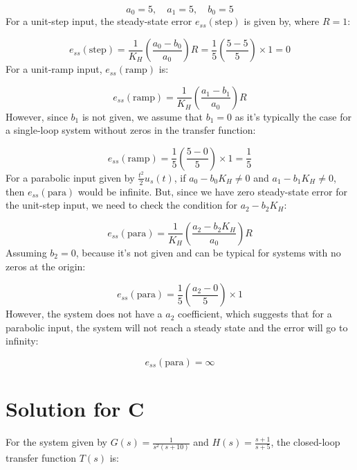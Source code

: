 \documentclass[11pt]{article}
\begin{document}
\[
a_0 = 5, \quad a_1 = 5, \quad b_0 = 5
\]
For a unit-step input, the steady-state error \( e_{ss}(\text{step}) \) is given by, where \( R = 1 \):

\[
e_{ss}(\text{step}) = \frac{1}{K_H} \left( \frac{a_0 - b_0}{a_0} \right)R = \frac{1}{5} \left( \frac{5 - 5}{5} \right) \times 1 = 0
\]
For a unit-ramp input, \( e_{ss}(\text{ramp}) \) is:

\[
e_{ss}(\text{ramp}) = \frac{1}{K_H} \left( \frac{a_1 - b_1}{a_0} \right)R
\]
However, since \( b_1 \) is not given, we assume that \( b_1 = 0 \) as it's typically the case for a single-loop system without zeros in the transfer function:

\[
e_{ss}(\text{ramp}) = \frac{1}{5} \left( \frac{5 - 0}{5} \right) \times 1 = \frac{1}{5}
\]
For a parabolic input given by \( \frac{t^2}{2} u_s(t) \), if \( a_0 - b_0K_H \neq 0 \) and \( a_1 - b_1K_H \neq 0 \), then \( e_{ss}(\text{para}) \) would be infinite. But, since we have zero steady-state error for the unit-step input, we need to check the condition for \( a_2 - b_2K_H \):

\[
e_{ss}(\text{para}) = \frac{1}{K_H} \left( \frac{a_2 - b_2K_H}{a_0} \right)R
\]
Assuming \( b_2 = 0 \), because it's not given and can be typical for systems with no zeros at the origin:

\[
e_{ss}(\text{para}) = \frac{1}{5} \left( \frac{a_2 - 0}{5} \right) \times 1
\]
However, the system does not have a \( a_2 \) coefficient, which suggests that for a parabolic input, the system will not reach a steady state and the error will go to infinity:

\[
e_{ss}(\text{para}) = \infty
\]
\newpage
\section*{Solution for C}
For the system given by \( G(s) = \frac{1}{s^2(s + 10)} \) and \( H(s) = \frac{s + 1}{s + 5} \), the closed-loop transfer function \( T(s) \) is:
\end{document}
